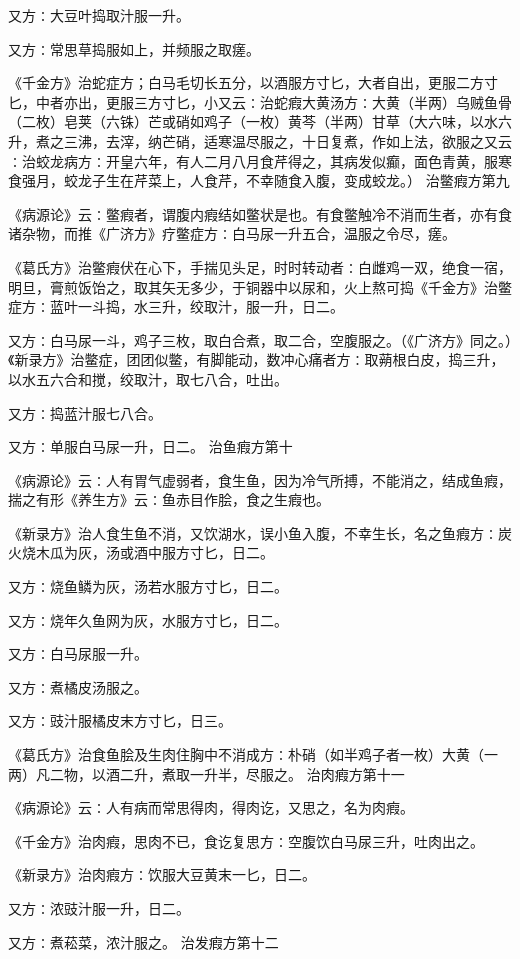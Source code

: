 \documentclass[a4paper,12pt,UTF8,twoside]{ctexbook}
\begin{document}
又方∶大豆叶捣取汁服一升。

又方∶常思草捣服如上，并频服之取瘥。

《千金方》治蛇症方；白马毛切长五分，以酒服方寸匕，大者自出，更服二方寸匕，中者亦出，更服三方寸匕，小又云∶治蛇瘕大黄汤方∶大黄（半两）乌贼鱼骨（二枚）皂荚（六铢）芒或硝如鸡子（一枚）黄芩（半两）甘草（大六味，以水六升，煮之三沸，去滓，纳芒硝，适寒温尽服之，十日复煮，作如上法，欲服之又云∶治蛟龙病方∶开皇六年，有人二月八月食芹得之，其病发似癫，面色青黄，服寒食强月，蛟龙子生在芹菜上，人食芹，不幸随食入腹，变成蛟龙。）
治鳖瘕方第九

《病源论》云∶鳖瘕者，谓腹内瘕结如鳖状是也。有食鳖触冷不消而生者，亦有食诸杂物，而推《广济方》疗鳖症方∶白马尿一升五合，温服之令尽，瘥。

《葛氏方》治鳖瘕伏在心下，手揣见头足，时时转动者∶白雌鸡一双，绝食一宿，明旦，膏煎饭饴之，取其矢无多少，于铜器中以尿和，火上熬可捣《千金方》治鳖症方∶蓝叶一斗捣，水三升，绞取汁，服一升，日二。

又方∶白马尿一斗，鸡子三枚，取白合煮，取二合，空腹服之。（《广济方》同之。）《新录方》治鳖症，团团似鳖，有脚能动，数冲心痛者方∶取蒴根白皮，捣三升，以水五六合和搅，绞取汁，取七八合，吐出。

又方∶捣蓝汁服七八合。

又方∶单服白马尿一升，日二。
治鱼瘕方第十

《病源论》云∶人有胃气虚弱者，食生鱼，因为冷气所搏，不能消之，结成鱼瘕，揣之有形《养生方》云∶鱼赤目作脍，食之生瘕也。

《新录方》治人食生鱼不消，又饮湖水，误小鱼入腹，不幸生长，名之鱼瘕方∶炭火烧木瓜为灰，汤或酒中服方寸匕，日二。

又方∶烧鱼鳞为灰，汤若水服方寸匕，日二。

又方∶烧年久鱼网为灰，水服方寸匕，日二。

又方∶白马尿服一升。

又方∶煮橘皮汤服之。

又方∶豉汁服橘皮末方寸匕，日三。

《葛氏方》治食鱼脍及生肉住胸中不消成方∶朴硝（如半鸡子者一枚）大黄（一两）凡二物，以酒二升，煮取一升半，尽服之。
治肉瘕方第十一

《病源论》云∶人有病而常思得肉，得肉讫，又思之，名为肉瘕。

《千金方》治肉瘕，思肉不已，食讫复思方∶空腹饮白马尿三升，吐肉出之。

《新录方》治肉瘕方∶饮服大豆黄末一匕，日二。

又方∶浓豉汁服一升，日二。

又方∶煮菘菜，浓汁服之。
治发瘕方第十二
\end{document}

